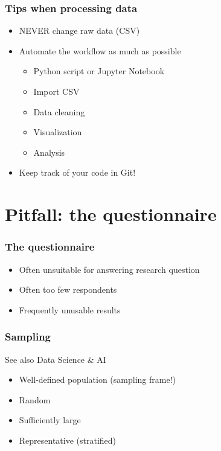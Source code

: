 \documentclass[aspectratio=169]{beamer}
\begin{document}
\begin{frame}    
    \frametitle{Tips when processing data}    
    \begin{itemize}
        \item NEVER change raw data (CSV)
        \item Automate the workflow as much as possible
        \begin{itemize}
            \item Python script or Jupyter Notebook
            \item Import CSV
            \item Data cleaning
            \item Visualization
            \item Analysis
        \end{itemize}
        \item Keep track of your code in Git!
    \end{itemize}
 

\end{frame}

\section{Pitfall: the questionnaire}

\begin{frame}
  \frametitle{The questionnaire}

 
 \bigskip
 
 \begin{itemize}
     \item Often unsuitable for answering research question
     \item Often too few respondents
     \item Frequently unusable results
 \end{itemize}

\end{frame}

\begin{frame}
 \frametitle{Sampling}
 
 See also Data Science \& AI
 
 \begin{itemize}
     \item Well-defined population (sampling frame!)
     \item Random
     \item Sufficiently large
     \item Representative (stratified)
 \end{itemize}

\end{frame}
\end{document}
